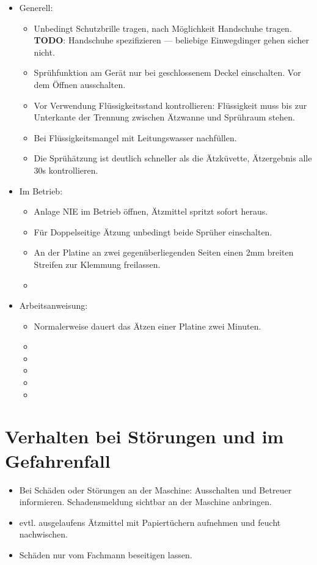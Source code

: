 \documentclass[fontsize=9pt]{scrartcl}
\newenvironment{smallitemize}{\begin{itemize}\itemsep -3pt}{\end{itemize}}
\begin{document}
\begin{itemize}
	\item Generell:
	\begin{smallitemize}
		\item Unbedingt Schutzbrille tragen, nach Möglichkeit Handschuhe tragen.\\
		\textbf{TODO}: Handschuhe spezifizieren --- beliebige Einwegdinger gehen sicher nicht.
		\item Sprühfunktion am Gerät nur bei geschlossenem Deckel einschalten. Vor dem Öffnen ausschalten.
		\item Vor Verwendung Flüssigkeitsstand kontrollieren: Flüssigkeit muss bis zur Unterkante der Trennung zwischen Ätzwanne und Sprühraum stehen.
		\item Bei Flüssigkeitsmangel mit Leitungswasser nachfüllen.
		\item Die Sprühätzung ist deutlich schneller als die Ätzküvette, Ätzergebnis alle 30s kontrollieren.
		
	\end{smallitemize}
	\item Im Betrieb:
	\begin{smallitemize}
		\item Anlage NIE im Betrieb öffnen, Ätzmittel spritzt sofort heraus.
		\item Für Doppelseitige Ätzung unbedingt beide Sprüher einschalten.
		\item An der Platine an zwei gegenüberliegenden Seiten einen 2mm breiten Streifen zur Klemmung freilassen.
		\item 
		
	\end{smallitemize}
	\item Arbeitsanweisung:
	\begin{smallitemize}
		\item Normalerweise dauert das Ätzen einer Platine zwei Minuten.
		\item 
		\item 
		\item 
		\item 
		\item 
		\end{smallitemize}
\end{itemize}

\section{Verhalten bei Störungen und im Gefahrenfall}
\begin{smallitemize}
	\item Bei Schäden oder Störungen an der Maschine: Ausschalten und Betreuer informieren. Schadensmeldung sichtbar an der Maschine anbringen.
	\item evtl. ausgelaufens Ätzmittel mit Papiertüchern aufnehmen und feucht nachwischen.
	\item Schäden nur vom Fachmann beseitigen lassen.
\end{smallitemize}
\end{document}
